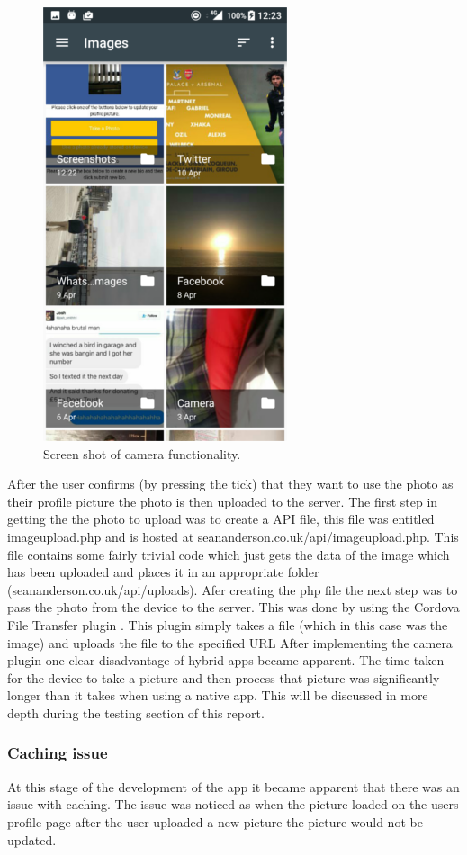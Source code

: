 \begin{figure}[H]
\includegraphics[scale=0.5]{images/sc9}
\caption{Screen shot of camera functionality.}
\end{figure}

After the user confirms (by pressing the tick) that they want to use the photo as their profile picture the photo is then uploaded to the server. The first step in getting the  the photo to upload was to create a API file, this file was entitled imageupload.php and is hosted at seananderson.co.uk/api/imageupload.php. This file contains some fairly trivial code which just gets the data of the image which has been uploaded and places it in an appropriate folder (seananderson.co.uk/api/uploads). Afer creating the php file the next step was to pass the photo from the device to the server. This was done by using the Cordova File Transfer plugin \cite{ft}. This plugin simply takes a file (which in this case was the image) and uploads the file to the specified URL
After implementing the camera plugin one clear disadvantage of hybrid apps became apparent. The time taken for the device to take a picture and then process that picture was significantly longer than it takes when using a native app. This will be discussed in more depth during the testing section of this report. 

\subsubsection{Caching issue}
At this stage of the development of the app it became apparent that there was an issue with caching. The issue was noticed as when the picture loaded on the users profile page after the user uploaded a new picture the picture would not be updated. 

